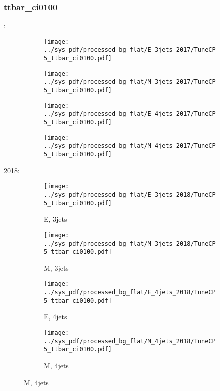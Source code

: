 \documentclass{beamer}
\begin{document}
\begin{frame}
\frametitle{ttbar_ci0100}
\fontsize{5}{1}:
\begin{figure}
\centering
\begin{subfigure}[b]{0.24\textwidth}
\texttt{[image: ../sys\_pdf/processed\_bg\_flat/E\_3jets\_2017/TuneCP5\_ttbar\_ci0100.pdf]}
\end{subfigure}
\begin{subfigure}[b]{0.24\textwidth}
\texttt{[image: ../sys\_pdf/processed\_bg\_flat/M\_3jets\_2017/TuneCP5\_ttbar\_ci0100.pdf]}
\end{subfigure}
\begin{subfigure}[b]{0.24\textwidth}
\texttt{[image: ../sys\_pdf/processed\_bg\_flat/E\_4jets\_2017/TuneCP5\_ttbar\_ci0100.pdf]}
\end{subfigure}
\begin{subfigure}[b]{0.24\textwidth}
\texttt{[image: ../sys\_pdf/processed\_bg\_flat/M\_4jets\_2017/TuneCP5\_ttbar\_ci0100.pdf]}
\end{subfigure}
\end{figure}
2018:
\begin{figure}
\centering
\begin{subfigure}[b]{0.24\textwidth}
\texttt{[image: ../sys\_pdf/processed\_bg\_flat/E\_3jets\_2018/TuneCP5\_ttbar\_ci0100.pdf]}
\captionsetup{font=tiny}
\caption{E, 3jets}
\end{subfigure}
\begin{subfigure}[b]{0.24\textwidth}
\texttt{[image: ../sys\_pdf/processed\_bg\_flat/M\_3jets\_2018/TuneCP5\_ttbar\_ci0100.pdf]}
\captionsetup{font=tiny}
\caption{M, 3jets}
\end{subfigure}
\begin{subfigure}[b]{0.24\textwidth}
\texttt{[image: ../sys\_pdf/processed\_bg\_flat/E\_4jets\_2018/TuneCP5\_ttbar\_ci0100.pdf]}
\captionsetup{font=tiny}
\caption{E, 4jets}
\end{subfigure}
\begin{subfigure}[b]{0.24\textwidth}
\texttt{[image: ../sys\_pdf/processed\_bg\_flat/M\_4jets\_2018/TuneCP5\_ttbar\_ci0100.pdf]}
\captionsetup{font=tiny}
\caption{M, 4jets}
\end{subfigure}
\end{figure}
\end{frame}
\end{document}
